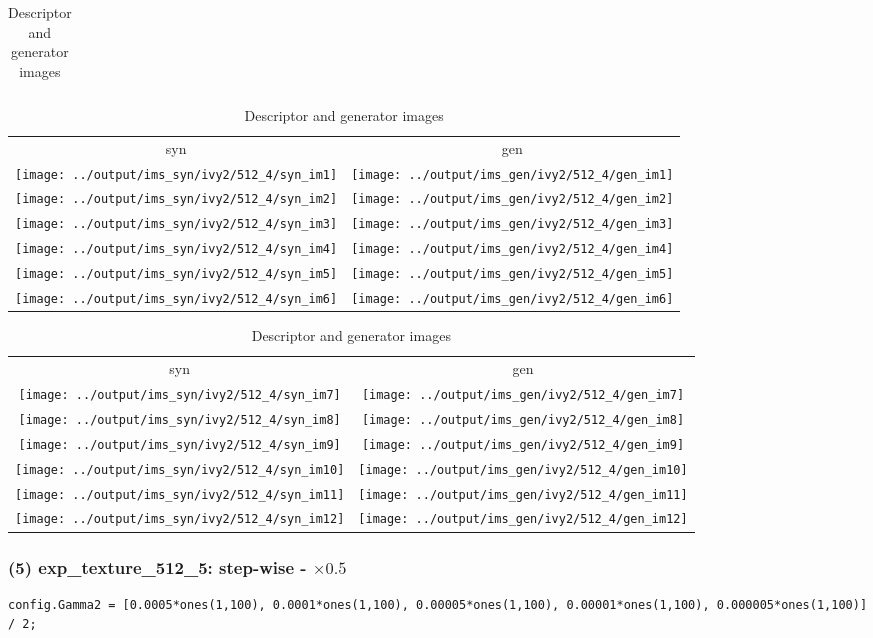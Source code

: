 \documentclass[letter]{article}
\begin{document}
\begin{table}[h!]
\begin{tabular}{c}
	\end{tabular}
	\begin{tabular}{cc}
		syn & gen\tabularnewline
		\texttt{[image: ../output/ims\_syn/ivy2/512\_4/syn\_im1]} & \texttt{[image: ../output/ims\_gen/ivy2/512\_4/gen\_im1]} \tabularnewline
		\texttt{[image: ../output/ims\_syn/ivy2/512\_4/syn\_im2]} & \texttt{[image: ../output/ims\_gen/ivy2/512\_4/gen\_im2]} \tabularnewline
		\texttt{[image: ../output/ims\_syn/ivy2/512\_4/syn\_im3]} & \texttt{[image: ../output/ims\_gen/ivy2/512\_4/gen\_im3]} \tabularnewline
		\texttt{[image: ../output/ims\_syn/ivy2/512\_4/syn\_im4]} & \texttt{[image: ../output/ims\_gen/ivy2/512\_4/gen\_im4]} \tabularnewline
		\texttt{[image: ../output/ims\_syn/ivy2/512\_4/syn\_im5]} & \texttt{[image: ../output/ims\_gen/ivy2/512\_4/gen\_im5]} \tabularnewline
		\texttt{[image: ../output/ims\_syn/ivy2/512\_4/syn\_im6]} & \texttt{[image: ../output/ims\_gen/ivy2/512\_4/gen\_im6]} \tabularnewline
	\end{tabular}
	\begin{tabular}{cc}
		syn & gen\tabularnewline
		\texttt{[image: ../output/ims\_syn/ivy2/512\_4/syn\_im7]} & \texttt{[image: ../output/ims\_gen/ivy2/512\_4/gen\_im7]} \tabularnewline
		\texttt{[image: ../output/ims\_syn/ivy2/512\_4/syn\_im8]} & \texttt{[image: ../output/ims\_gen/ivy2/512\_4/gen\_im8]} \tabularnewline
		\texttt{[image: ../output/ims\_syn/ivy2/512\_4/syn\_im9]} & \texttt{[image: ../output/ims\_gen/ivy2/512\_4/gen\_im9]} \tabularnewline
		\texttt{[image: ../output/ims\_syn/ivy2/512\_4/syn\_im10]} & \texttt{[image: ../output/ims\_gen/ivy2/512\_4/gen\_im10]} \tabularnewline
		\texttt{[image: ../output/ims\_syn/ivy2/512\_4/syn\_im11]} & \texttt{[image: ../output/ims\_gen/ivy2/512\_4/gen\_im11]} \tabularnewline
		\texttt{[image: ../output/ims\_syn/ivy2/512\_4/syn\_im12]} & \texttt{[image: ../output/ims\_gen/ivy2/512\_4/gen\_im12]} \tabularnewline
	\end{tabular}
	\caption{Descriptor and generator images}
\end{table}

\newpage

\subsubsection*{(5) exp\_texture\_512\_5: step-wise - $\times0.5$}

\begin{lstlisting}
config.Gamma2 = [0.0005*ones(1,100), 0.0001*ones(1,100), 0.00005*ones(1,100), 0.00001*ones(1,100), 0.000005*ones(1,100)] / 2;
\end{lstlisting}
\end{document}
